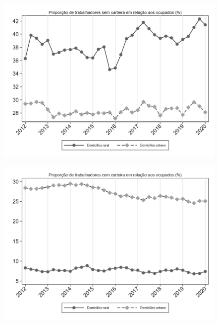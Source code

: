 \begin{frame}[label=_composicao_demografica_rural_urbano_prop_empregadoSC]{}
\textit{\hyperlink{_composicao_demografica_rural_urbano}{}}
\begin{figure}
  \centering
  \includegraphics[width=1.0\linewidth]{../../analysis/output/composicao_demografica/area_geografica/_composicao_demografica_rural_urbano_prop_empregadoSC.png}
  \caption{}
  \label{fig:_composicao_demografica_rural_urbano_prop_empregadoSC}
\end{figure}
\end{frame}

\begin{frame}[label=_composicao_demografica_rural_urbano_prop_empregadoCC]{}
\textit{\hyperlink{_composicao_demografica_rural_urbano}{}}
\begin{figure}
  \centering
  \includegraphics[width=1.0\linewidth]{../../analysis/output/composicao_demografica/area_geografica/_composicao_demografica_rural_urbano_prop_empregadoCC.png}
  \caption{}
  \label{fig:_composicao_demografica_rural_urbano_prop_empregadoCC}
\end{figure}
\end{frame}

